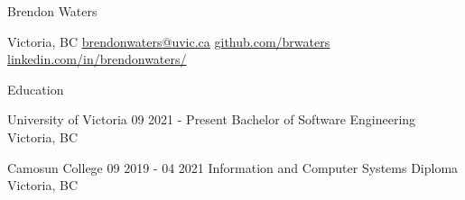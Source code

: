\documentclass{resume}
\begin{document}
\begin{namesection}
    {Brendon Waters}
\end{namesection}

\begin{contactsection}
    {Victoria, BC}
    {\href{mailto:brendonwaters@uvic.ca}{brendonwaters@uvic.ca}}
    {\href{https://github.com/brwaters}{github.com/brwaters}}
    {\href{https://www.linkedin.com/in/brendonwaters/}{linkedin.com/in/brendonwaters/}}
\end{contactsection}

\begin{headersection}
    {Education}
\end{headersection}
\begin{generalsection}
    {University of Victoria}
    {09 2021 - Present}
    {Bachelor of Software Engineering}
    {Victoria, BC}
\end{generalsection}
\begin{generalsection}
    {Camosun College}
    {09 2019 - 04 2021}
    {Information and Computer Systems Diploma}
    {Victoria, BC}
\end{generalsection}
\end{document}
